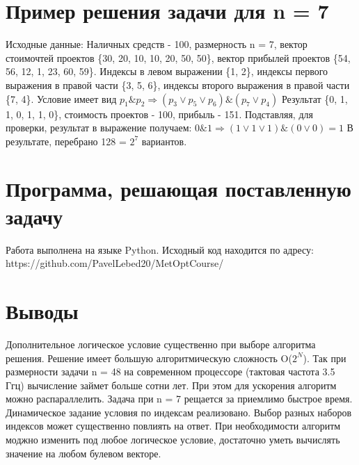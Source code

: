 \documentclass[a4paper,12pt]{article}
\begin{document}
\section{Пример решения задачи для n = 7}
Исходные данные:
Наличных средств - 100, размерность n = 7, вектор стоимочтей проектов \{30, 20, 10, 10, 20, 50, 50\}, вектор прибылей проектов \{54, 56, 12, 1, 23, 60, 59\}.
Индексы в левом выражении \{1, 2\}, индексы первого выражения в правой части \{3, 5, 6\}, индексы второго выражения в правой части \{7, 4\}.
\newline Условие имеет вид $p_1 \& p_2 \Rightarrow (p_3 \vee p_5 \vee p_6) \& (p_7 \vee p_4)$
\newline Результат \{0, 1, 1, 0, 1, 1, 0\}, стоимость проектов - 100, прибыль - 151.
Подставляя, для проверки, результат в выражение получаем:
\newline $0 \& 1 \Rightarrow (1 \vee 1 \vee 1) \& (0 \vee 0) = 1$
\newline В результате, перебрано 128 = $2^7$ вариантов.

\section{Программа, решающая поставленную задачу}
Работа выполнена на языке Python. Исходный код находится по адресу:
\newline https://github.com/PavelLebed20/MetOptCourse/

\section{Выводы}
Дополнительное логическое условие существенно при выборе алгоритма решения. Решение имеет большую алгоритмическую сложность O($2^{N}$).
Так при размерности задачи n = 48 на современном процессоре (тактовая частота 3.5 Ггц) вычисление займет больше сотни лет. При этом для ускорения алгоритм можно распараллелить. Задача при n = 7 рещается за приемлимо быстрое время. Динамическое задание условия по индексам реализовано. Выбор разных наборов индексов может существенно повлиять на ответ. При необходимости алгоритм моджно изменить под любое логическое условие, достаточно уметь вычислять значение на любом булевом векторе. 



\end{document}
